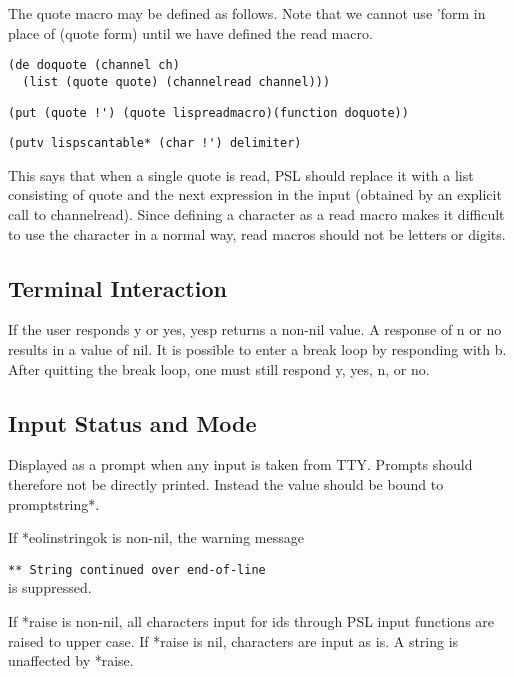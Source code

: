   The quote macro may be defined  as  follows.    Note  that  we
cannot  use 'form in place of (quote form) until we have defined
the read macro.

\begin{verbatim}
(de doquote (channel ch)
  (list (quote quote) (channelread channel)))
\end{verbatim}
\begin{verbatim}
(put (quote !') (quote lispreadmacro)(function doquote))
\end{verbatim}
\begin{verbatim}
(putv lispscantable* (char !') delimiter)
\end{verbatim}
  This says that when a single quote is read, PSL should replace
it with a list consisting of quote and the  next  expression  in
the  input (obtained by an explicit call to channelread).  Since
defining a character as a read macro makes it difficult  to  use
the character in a normal way, read macros should not be letters
or digits.

\subsection{Terminal Interaction}

{    If the user responds y or yes, yesp returns a non-nil value.
    A  response  of  n  or  no results in a value of nil.  It is
    possible to enter a break loop by responding with b.   After
    quitting  the  break loop, one must still respond y, yes, n,
    or no.
}

\subsection{Input Status and Mode}

{
    Displayed as a prompt when any  input  is  taken  from  TTY.
    Prompts  should  therefore not be directly printed.  Instead
    the value should be bound to promptstring*.
}

{
    If *eolinstringok is non-nil, the warning message

{\tt *** String continued over end-of-line }\\
    is suppressed.
}

{
    If *raise is  non-nil,  all  characters    input  for    ids
    through  PSL input  functions are raised  to upper case.  If
    *raise is nil, characters are input  as is.    A  string  is
    unaffected by *raise.
}

